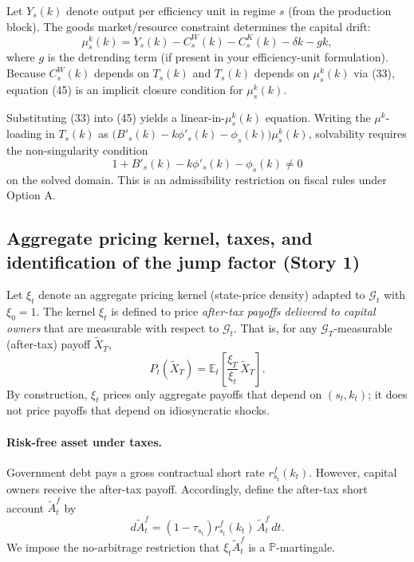 \documentclass{article}
\begin{document}
Let $Y_s(k)$ denote output per efficiency unit in regime $s$ (from the production block). The goods market/resource constraint determines the capital drift:
\begin{equation}
\mu^k_s(k)=Y_s(k)-C^W_s(k)-C^K_s(k)-\delta k-gk,
\tag{45}
\end{equation}
where $g$ is the detrending term (if present in your efficiency-unit formulation). Because $C^W_s(k)$ depends on $T_s(k)$ and $T_s(k)$ depends on $\mu^k_s(k)$ via (33), equation (45) is an implicit closure condition for $\mu^k_s(k)$.

Substituting (33) into (45) yields a linear-in-$\mu^k_s(k)$ equation. Writing the $\mu^k$-loading in $T_s(k)$ as $\big(B'_s(k)-k\phi'_s(k)-\phi_s(k)\big)\mu^k_s(k)$, solvability requires the non-singularity condition
\[
1 + B'_s(k) - k\phi'_s(k) - \phi_s(k) \neq 0
\]
on the solved domain. This is an admissibility restriction on fiscal rules under Option A.

\subsection{Aggregate pricing kernel, taxes, and identification of the jump factor (Story 1)}
Let $\xi_t$ denote an aggregate pricing kernel (state-price density) adapted to $\mathcal G_t$ with
$\xi_0=1$. The kernel $\xi_t$ is defined to price \emph{after-tax payoffs delivered to capital owners}
that are measurable with respect to $\mathcal G_t$. That is, for any $\mathcal G_T$-measurable
(after-tax) payoff $\widetilde X_T$,
\begin{equation}
P_t(\widetilde X_T)=\mathbb{E}_t\!\left[\frac{\xi_T}{\xi_t}\,\widetilde X_T\right].
\tag{46}
\end{equation}
By construction, $\xi_t$ prices only aggregate payoffs that depend on $(s_t,k_t)$; it does not price
payoffs that depend on idiosyncratic shocks.

\paragraph{Risk-free asset under taxes.}
Government debt pays a gross contractual short rate $r^f_{s_t}(k_t)$. However, capital owners receive
the after-tax payoff. Accordingly, define the after-tax short account $\widetilde A^f_t$ by
\begin{equation}
d\widetilde A^f_t = (1-\tau_{s_t})r^f_{s_t}(k_t)\,\widetilde A^f_t\,dt.
\tag{47}
\end{equation}
We impose the no-arbitrage restriction that $\xi_t \widetilde A^f_t$ is a $\mathbb P$-martingale.
\end{document}
